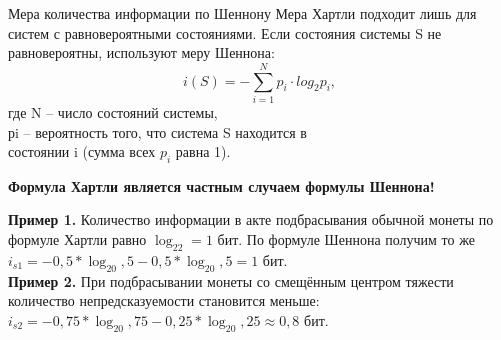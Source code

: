 \begin{frame}{Мера количества информации по Шеннону}
\noindent Мера Хартли подходит лишь для систем с равновероятными состояниями.
Если состояния системы S не равновероятны, используют меру Шеннона:
$$i(S)=-\sum_{i=1}^Np_i\cdot log_2p_i,$$
где N – число состояний системы,\\
\noindent рi – вероятность того, что система S находится в\\
\noindent состоянии i (сумма всех $p_i$ равна 1).
\vspace{0.2cm}
\begin{center}
	\color[rgb]{0,0.7,0.4}
	\textbf{Формула Хартли является частным случаем формулы Шеннона!}
	\color{black}
\end{center}
\noindent\textbf{Пример 1.} Количество информации в акте подбрасывания обычной монеты по формуле Хартли равно $\log_22=1$ бит. По формуле Шеннона получим то же $i_{s1}=-0,5*\log_20,5-0,5*\log_20,5=1$ бит.\\
\noindent\textbf{Пример 2.} При подбрасывании монеты со смещённым центром тяжести количество непредсказуемости становится меньше: $i_{s2}=-0,75*\log_20,75-0,25*\log_20,25\approx0,8$ бит.
\end{frame}